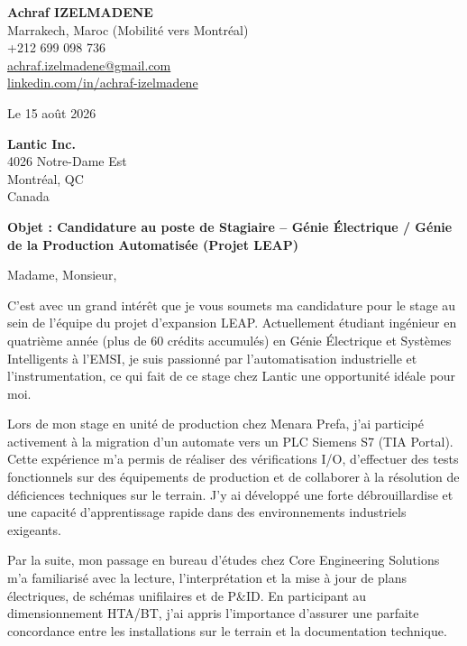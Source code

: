 \documentclass[11pt,a4paper]{article}
\begin{document}
\begin{flushleft}
\textbf{\Large Achraf IZELMADENE}\\
Marrakech, Maroc (Mobilité vers Montréal)\\
+212 699 098 736\\
\href{mailto:achraf.izelmadene@gmail.com}{achraf.izelmadene@gmail.com}\\
\href{https://www.linkedin.com/in/achraf-izelmadene/}{linkedin.com/in/achraf-izelmadene}
\end{flushleft}

\vspace{0.5cm}

\begin{flushright}
Le 15 août 2026
\end{flushright}

\vspace{0.3cm}

\textbf{Lantic Inc.}\\
4026 Notre-Dame Est\\
Montréal, QC\\
Canada

\vspace{0.5cm}

\textbf{Objet : Candidature au poste de Stagiaire – Génie Électrique / Génie de la Production Automatisée (Projet LEAP)}

\vspace{0.5cm}

Madame, Monsieur,

C'est avec un grand intérêt que je vous soumets ma candidature pour le stage au sein de l'équipe du projet d'expansion LEAP. Actuellement étudiant ingénieur en quatrième année (plus de 60 crédits accumulés) en Génie Électrique et Systèmes Intelligents à l'EMSI, je suis passionné par l'automatisation industrielle et l'instrumentation, ce qui fait de ce stage chez Lantic une opportunité idéale pour moi.

Lors de mon stage en unité de production chez Menara Prefa, j'ai participé activement à la migration d'un automate vers un PLC Siemens S7 (TIA Portal). Cette expérience m'a permis de réaliser des vérifications I/O, d'effectuer des tests fonctionnels sur des équipements de production et de collaborer à la résolution de déficiences techniques sur le terrain. J'y ai développé une forte débrouillardise et une capacité d'apprentissage rapide dans des environnements industriels exigeants.

Par la suite, mon passage en bureau d'études chez Core Engineering Solutions m'a familiarisé avec la lecture, l'interprétation et la mise à jour de plans électriques, de schémas unifilaires et de P\&ID. En participant au dimensionnement HTA/BT, j'ai appris l'importance d'assurer une parfaite concordance entre les installations sur le terrain et la documentation technique. 
\end{document}
